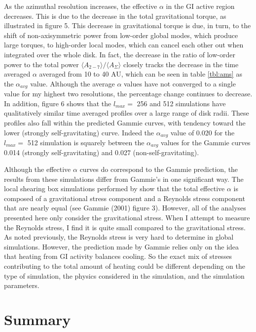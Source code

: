 \documentclass[manuscript]{aastex} %
\begin{document}
As the azimuthal resolution increases, the effective $\alpha$ in the GI active region decreases. This is due to the decrease in the total gravitational torque, as illustrated in figure 5. This decrease in gravitational torque is due, in turn, to the shift of non-axisymmetric power from low-order global modes, which produce large torques, to high-order local modes, which can cancel each other out when integrated over the whole disk. In fact, the decrease in the ratio of low-order power to the total power $\langle A_{2-7}\rangle / \langle A_\Sigma \rangle$ closely tracks the decrease in the time averaged $\alpha$ averaged from 10 to 40 AU, which can be seen in table \ref{tbl:ams} as the $\alpha_{avg}$ value. Although the average $\alpha$ values have not converged to a single value for my highest two resolutions, the percentage change continues to decrease. In addition, figure 6 shows that the $l_{max} =$ 256
and 512 simulations have qualitatively similar time averaged profiles over a large range of disk radii. These profiles also fall within the predicted Gammie curves, with tendency toward the lower (strongly self-gravitating) curve. Indeed the $\alpha_{avg}$ value of 0.020 for the $l_{max} = $ 512 simulation is squarely between the $\alpha_{avg}$ values for the Gammie curves 0.014 (strongly self-gravitating) and 0.027 (non-self-gravitating).

Although the effective $\alpha$ curves do correspond to the Gammie prediction, the results from these simulations differ from Gammie's in one significant way. The local shearing box simulations performed by \citet{gammie2001} show that the total effective $\alpha$ is composed of a gravitational stress component and a Reynolds stress component that are nearly equal (see Gammie (2001) figure 3). However, all of the analyses
presented here only consider the gravitational stress. When I attempt to measure
the Reynolds stress, I find it is quite small compared to the gravitational stress. As
noted previously, the Reynolds stress is very hard to determine in global simulations.
However, the prediction made by Gammie relies only on the idea that heating from
GI activity balances cooling. So the exact mix of stresses contributing to the total
amount of heating could be different depending on the type of simulation, the physics
considered in the simulation, and the simulation parameters.


\section{Summary}
\end{document}
